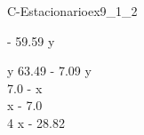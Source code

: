 
\begin{bilevelmodel}{C-Estacionario}{ex9_1_2}
    \begin{upperlevel}{- 59.59 y}{
        
    }
    \end{upperlevel}
    \begin{lowerlevel}{y}{
         63.49 - 7.09 y  \\ 
 7.0 - x  \\ 
 x - 7.0  \\ 
 4 x - 28.82 
    }
    \end{lowerlevel}
\end{bilevelmodel}
    
        